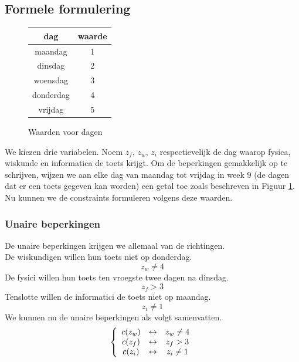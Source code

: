 \documentclass[alternative-exam.tex]{subfiles}
\begin{document}
\subsection{Formele formulering}
\begin{figure}[H]
\centering
\caption{Waarden voor dagen}
\label{waarde_dagen}
\begin{tabular}{| c | c | }
\hline
dag & waarde\\
\hline
maandag & 1\\
dinsdag & 2\\
woensdag & 3\\
donderdag & 4\\
vrijdag & 5\\
\hline
\end{tabular}
\end{figure}
We kiezen drie variabelen. Noem $z_f$, $z_w$, $z_i$ respectievelijk de dag waarop fysica, wiskunde en informatica de toets krijgt. Om de beperkingen gemakkelijk op te schrijven, wijzen we aan elke dag van maandag tot vrijdag in week 9 (de dagen dat er een toets gegeven kan worden) een getal toe zoals beschreven in Figuur \ref{waarde_dagen}.
Nu kunnen we de constraints formuleren volgens deze waarden.

\subsubsection{Unaire beperkingen}
De unaire beperkingen krijgen we allemaal van de richtingen.\\
De wiskundigen willen hun toets niet op donderdag.
\[
z_w \neq 4
\]
De fysici willen hun toets ten vroegste twee dagen na dinsdag.
\[
z_f > 3
\]
Tenslotte willen de informatici de toets niet op maandag.
\[
z_i \neq 1
\]
We kunnen nu de unaire beperkingen als volgt samenvatten.
\[
\left\lbrace
\begin{array}{c c c}
c(z_w) & \leftrightarrow & z_w \neq 4\\
c(z_f) & \leftrightarrow & z_f > 3\\
c(z_i) & \leftrightarrow & z_i \neq 1\\
\end{array}
\right.
\]
\end{document}
